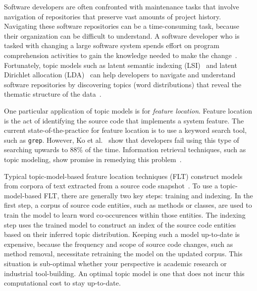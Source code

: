 
Software developers are often confronted with maintenance tasks that involve navigation of repositories that preserve vast amounts of project history.
Navigating these software repositories can be a time-consuming task, because their organization can be difficult to understand.
A software developer who is tasked with changing a large software system spends effort on program comprehension activities to gain the knowledge needed to make the change~\cite{Corbi:1989}.
Fortunately, topic models such as
latent semantic indexing (LSI)~\cite{Deerwester-etal:1990} and
latent Dirichlet allocation (LDA)~\cite{Blei-etal:2003}
can help developers to navigate and understand software repositories
by discovering topics (word distributions) that reveal the thematic structure
of the data~\cite{Linstead-etal:2007,Thomas-etal:2011,Hindle-etal:2012}.

One particular application of topic models is for \emph{feature location}.
Feature location is the act of identifying the source code that implements a system feature.
The current state-of-the-practice for feature location is to use a keyword search tool, such as \texttt{grep}.
However, Ko et al.~\cite{Ko-etal:2006} show that developers fail using this type of searching upwards to 88\% of the time. 
Information retrieval techniques, such as topic modeling, show promise in remedying this problem~\cite{Marcus-etal:2004}.

Typical topic-model-based feature location techniques (FLT) construct models from corpora of text extracted from a source code snapshot~\cite{Dit-etal:2013b}.
To use a topic-model-based FLT, there are generally two key steps: training and indexing.
In the first step, a corpus of source code entities, such as methods or classes, are used to train the model to learn word co-occurences within those entities.
The indexing step uses the trained model to construct an index of the source code entities based on their inferred topic distribution.
Keeping such a model up-to-date is expensive, because the frequency and scope of source code changes, such as method removal, necessitate retraining the model on the updated corpus.
This situation is sub-optimal whether your perspective is academic research or industrial tool-building.
An optimal topic model is one that does not incur this computational cost to stay up-to-date.

